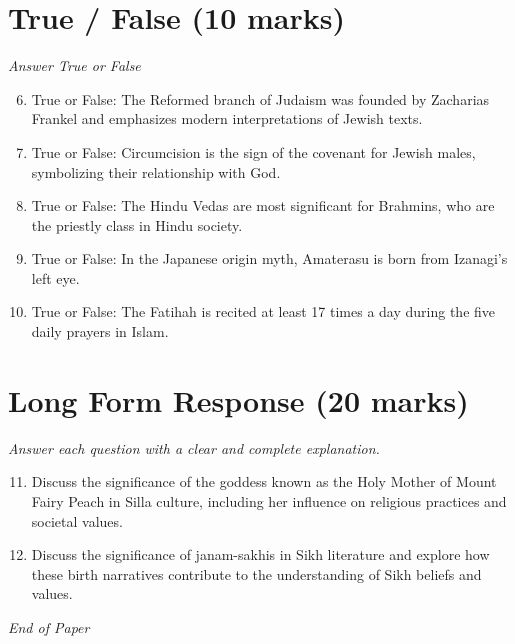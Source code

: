 \documentclass[12pt]{article}
\begin{document}
\section*{True / False (10 marks)}
\textit{Answer True or False}
\begin{enumerate}[label=\arabic*.]
\setcounter{enumi}{5}
\item True or False: The Reformed branch of Judaism was founded by Zacharias Frankel and emphasizes modern interpretations of Jewish texts.
\item True or False: Circumcision is the sign of the covenant for Jewish males, symbolizing their relationship with God.
\item True or False: The Hindu Vedas are most significant for Brahmins, who are the priestly class in Hindu society.
\item True or False: In the Japanese origin myth, Amaterasu is born from Izanagi's left eye.
\item True or False: The Fatihah is recited at least 17 times a day during the five daily prayers in Islam.
\end{enumerate}

\section*{Long Form Response (20 marks)}
\textit{Answer each question with a clear and complete explanation.}
\begin{enumerate}[label=\arabic*.]
\setcounter{enumi}{10}
\item Discuss the significance of the goddess known as the Holy Mother of Mount Fairy Peach in
Silla culture, including her influence on religious practices and societal values.
\item Discuss the significance of janam-sakhis in Sikh literature and explore how these birth
narratives contribute to the understanding of Sikh beliefs and values.
\end{enumerate}

\vfill
\noindent\textit{End of Paper}
\end{document}

